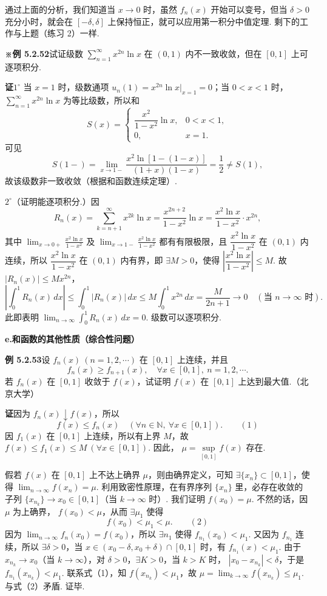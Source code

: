 \documentclass[UTF8, 12pt, fontset=fandol, oneside]{ctexart}
\begin{document}
通过上面的分析，我们知道当 $x\to0$ 时，虽然 $f_n(x)$ 开始可以变号，但当 $\delta>0$ 充分小时，就会在
$[-\delta,\delta]$ 上保持恒正，就可以应用第一积分中值定理. 剩下的工作与上题（练习 2）一样.

\noindent\textbf{※例 5.2.52}\quad 试证级数
$\displaystyle\sum_{n=1}^{\infty}x^{2n}\ln x$ 在 $(0,1)$ 内不一致收敛，但在 $[0,1]$ 上可逐项积分.

\noindent\textbf{证}\quad $1^\circ$ 当 $x=1$ 时，级数通项
$u_n(1)=x^{2n}\ln x\big|_{x=1}=0$；当 $0<x<1$ 时，
$\displaystyle\sum_{n=1}^{\infty}x^{2n}\ln x$ 为等比级数，所以和
\[
  S(x)=
  \begin{cases}
    \dfrac{x^2}{1-x^2}\ln x,&0<x<1,\\
    0,&x=1.
  \end{cases}
\]
可见
\[
  S(1-)=\lim_{x\to1-}\frac{x^2\ln[1-(1-x)]}{(1+x)(1-x)}
  =\frac12\ne S(1),
\]
故该级数非一致收敛（根据和函数连续定理）.

$2^\circ$（证明能逐项积分.）因
\[
  R_n(x)=\sum_{k=n+1}^{\infty}x^{2k}\ln x
  =\frac{x^{2n+2}}{1-x^2}\ln x
  =\frac{x^2\ln x}{1-x^2}\cdot x^{2n},
\]
其中 $\displaystyle\lim_{x\to0+}\frac{x^2\ln x}{1-x^2}$ 及
$\displaystyle\lim_{x\to1-}\frac{x^2\ln x}{1-x^2}$ 都有有限极限，且
$\dfrac{x^2\ln x}{1-x^2}$ 在 $(0,1)$ 内连续，所以
$\dfrac{x^2\ln x}{1-x^2}$ 在 $(0,1)$ 内有界，即 $\exists M>0$，使得
$\left|\dfrac{x^2\ln x}{1-x^2}\right|\le M$. 故
$|R_n(x)|\le Mx^{2n}$，
\[
  \left|\int_0^1 R_n(x)\,dx\right|
  \le\int_0^1|R_n(x)|\,dx
  \le M\int_0^1x^{2n}\,dx
  =\frac{M}{2n+1}\to0\quad(\text{当 }n\to\infty\text{ 时}).
\]
此即表明 $\displaystyle\lim_{n\to\infty}\int_0^1 R_n(x)\,dx=0$. 级数可以逐项积分.

\noindent\textbf{e.\quad 和函数的其他性质（综合性问题）}

\noindent\textbf{例 5.2.53}\quad 设 $f_n(x)\ (n=1,2,\cdots)$ 在 $[0,1]$ 上连续，并且
\[
  f_n(x)\ge f_{n+1}(x),\quad \forall x\in[0,1],\ n=1,2,\cdots.
\]
若 $f_n(x)$ 在 $[0,1]$ 收敛于 $f(x)$，试证明 $f(x)$ 在 $[0,1]$ 上达到最大值.（北京大学）

\noindent\textbf{证}\quad 因为 $f_n(x)\downarrow f(x)$，所以
\[
  f(x)\le f_n(x)\quad(\forall n\in\mathbb N,\ \forall x\in[0,1]).
\qquad(1)
\]
因 $f_1(x)$ 在 $[0,1]$ 上连续，所以有上界 $M$，故
$f(x)\le f_1(x)\le M\ (\forall x\in[0,1])$. 因此，
$\mu=\sup\limits_{[0,1]}f(x)$ 存在.

假若 $f(x)$ 在 $[0,1]$ 上不达上确界 $\mu$，则由确界定义，可知 $\exists\{x_n\}\subset[0,1]$，使得
$\displaystyle\lim_{n\to\infty}f(x_n)=\mu$. 利用致密性原理，在有界序列 $\{x_n\}$ 里，必存在收敛的子列
$\{x_{n_k}\}\to x_0\in[0,1]$（当 $k\to\infty$ 时）. 我们证明 $f(x_0)=\mu$. 不然的话，因 $\mu$ 为上确界，
$f(x_0)<\mu$，从而 $\exists\mu_1$ 使得
\[
  f(x_0)<\mu_1<\mu.
\qquad(2)
\]
因为 $\displaystyle\lim_{n\to\infty}f_n(x_0)=f(x_0)$，所以 $\exists n_1$ 使得
$f_{n_1}(x_0)<\mu_1$. 又因为 $f_{n_1}$ 连续，所以 $\exists\delta>0$，当
$x\in(x_0-\delta,x_0+\delta)\cap[0,1]$ 时，有 $f_{n_1}(x)<\mu_1$. 由于
$x_{n_k}\to x_0$（当 $k\to\infty$），对 $\delta>0$，$\exists K>0$，当 $k>K$ 时，
$|x_0-x_{n_k}|<\delta$，于是 $f_{n_1}(x_{n_k})<\mu_1$. 联系式（1），知
$f(x_{n_k})<\mu_1$，故
$\mu=\displaystyle\lim_{k\to\infty}f(x_{n_k})\le\mu_1$. 与式（2）矛盾. 证毕.
\end{document}

